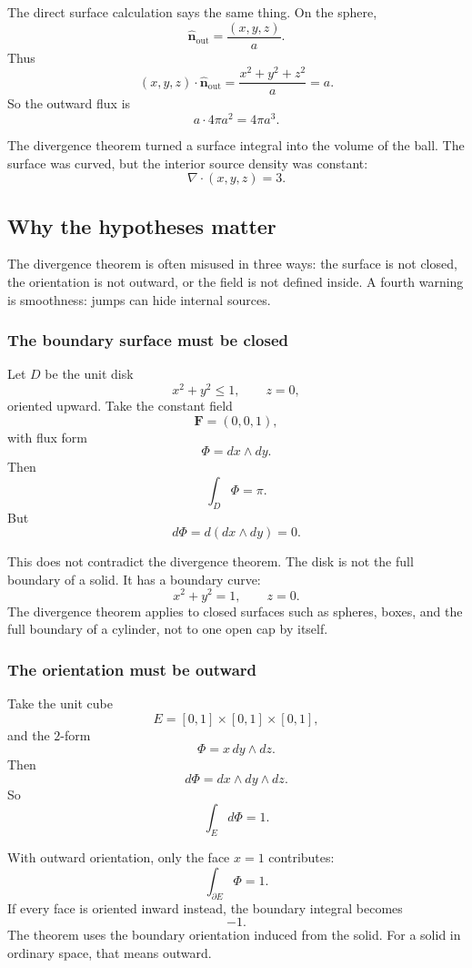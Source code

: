 The direct surface calculation says the same thing.  On the sphere,
\[
    \widehat{\mathbf n}_{\mathrm{out}}=\frac{(x,y,z)}{a}.
\]
Thus
\[
    (x,y,z)\cdot\widehat{\mathbf n}_{\mathrm{out}}
    =
    \frac{x^2+y^2+z^2}{a}
    =
    a.
\]
So the outward flux is
\[
    a\cdot 4\pi a^2=4\pi a^3.
\]

The divergence theorem turned a surface integral into the volume of the ball.  The
surface was curved, but the interior source density was constant:
\[
    \nabla\cdot(x,y,z)=3.
\]

\subsection{Why the hypotheses matter}

The divergence theorem is often misused in three ways: the surface is not closed, the
orientation is not outward, or the field is not defined inside.  A fourth warning is
smoothness: jumps can hide internal sources.

\subsubsection*{The boundary surface must be closed}

Let \(D\) be the unit disk
\[
    x^2+y^2\le1,
    \qquad
    z=0,
\]
oriented upward.  Take the constant field
\[
    \mathbf F=(0,0,1),
\]
with flux form
\[
    \Phi=dx\wedge dy.
\]
Then
\[
    \int_D\Phi=\pi.
\]
But
\[
    d\Phi=d(dx\wedge dy)=0.
\]

This does not contradict the divergence theorem.  The disk is not the full boundary of
a solid.  It has a boundary curve:
\[
    x^2+y^2=1,\qquad z=0.
\]
The divergence theorem applies to closed surfaces such as spheres, boxes, and the full
boundary of a cylinder, not to one open cap by itself.

\subsubsection*{The orientation must be outward}

Take the unit cube
\[
    E=[0,1]\times[0,1]\times[0,1],
\]
and the \(2\)-form
\[
    \Phi=x\,dy\wedge dz.
\]
Then
\[
    d\Phi=dx\wedge dy\wedge dz.
\]
So
\[
    \int_E d\Phi=1.
\]

With outward orientation, only the face \(x=1\) contributes:
\[
    \int_{\partial E}\Phi=1.
\]
If every face is oriented inward instead, the boundary integral becomes
\[
    -1.
\]
The theorem uses the boundary orientation induced from the solid.  For a solid in
ordinary space, that means outward.

